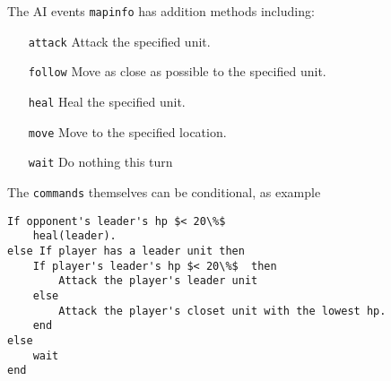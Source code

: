 The AI events \texttt{mapinfo} has addition methods including:
\begin{itemize}
	\item[\texttt{attack}]  Attack the specified unit.
	\item[\texttt{follow}]  Move as close as possible to the specified unit.
	\item[\texttt{heal}]    Heal the specified unit.
	\item[\texttt{move}]    Move to the specified location.
	\item[\texttt{wait}]    Do nothing this turn
\end{itemize}   

The \texttt{commands} themselves can be conditional, as example 
\begin{lstlisting}[caption=Pseudocode Conditional AI Event ]
If opponent's leader's hp $< 20\%$
	heal(leader).
else If player has a leader unit then
	If player's leader's hp $< 20\%$  then
	 	Attack the player's leader unit
	else
		Attack the player's closet unit with the lowest hp.
	end
else
	wait
end	
\end{lstlisting}

